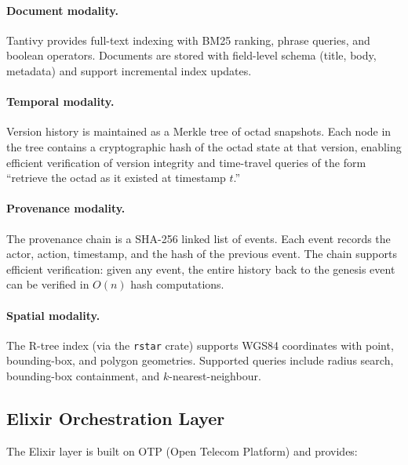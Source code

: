 \documentclass[11pt,twocolumn]{article}
\begin{document}
\paragraph{Document modality.}
Tantivy provides full-text indexing with BM25 ranking, phrase queries,
and boolean operators.  Documents are stored with field-level schema
(title, body, metadata) and support incremental index updates.

\paragraph{Temporal modality.}
Version history is maintained as a Merkle tree of octad snapshots.
Each node in the tree contains a cryptographic hash of the octad state
at that version, enabling efficient verification of version integrity
and time-travel queries of the form ``retrieve the octad as it existed
at timestamp $t$.''

\paragraph{Provenance modality.}
The provenance chain is a SHA-256 linked list of events.  Each event
records the actor, action, timestamp, and the hash of the previous event.
The chain supports efficient verification: given any event, the entire
history back to the genesis event can be verified in $O(n)$ hash
computations.

\paragraph{Spatial modality.}
The R-tree index (via the \texttt{rstar} crate) supports WGS84
coordinates with point, bounding-box, and polygon geometries.
Supported queries include radius search, bounding-box containment,
and $k$-nearest-neighbour.

\subsection{Elixir Orchestration Layer}

The Elixir layer is built on OTP (Open Telecom Platform) and provides:
\end{document}
